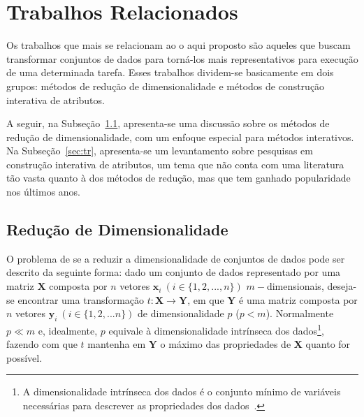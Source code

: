 \section{Trabalhos Relacionados}\label{sec:reld}

Os trabalhos que mais se relacionam ao o aqui proposto são
aqueles que buscam transformar conjuntos de dados para
torná-los mais representativos para execução de uma
determinada tarefa.  Esses trabalhos dividem-se basicamente
em dois grupos: métodos de redução de dimensionalidade e
métodos de construção interativa de atributos. 

A seguir, na Subseção~\ref{sec:rd}, apresenta-se uma
discussão sobre os métodos de redução de dimensionalidade,
com um enfoque especial para métodos interativos. Na
Subseção~\ref{sec:tr}, apresenta-se um levantamento sobre
pesquisas em construção interativa de atributos, um tema que
não conta com uma literatura tão vasta quanto à dos métodos
de redução, mas que tem ganhado popularidade nos últimos
anos. 

\subsection{Redução de Dimensionalidade}\label{sec:rd}

O problema de se a reduzir a dimensionalidade de conjuntos
de dados pode ser descrito da seguinte forma: dado um
conjunto de dados representado por uma matriz $\textbf{X}$
composta por $n$ vetores $\textbf{x}_i~(i \in
\{1,2,...,n\})$ $m-$dimensionais, deseja-se encontrar uma
transformação $t: \textbf{X} \rightarrow \textbf{Y}$, em que
$\textbf{Y}$ é uma matriz composta por $n$ vetores
$\textbf{y}_i~(i \in \{1,2,...n\})$ de dimensionalidade $p$
($p < m$).  Normalmente $p \ll m$ e, idealmente, $p$
equivale à dimensionalidade intrínseca dos dados\footnote{A
dimensionalidade intrínseca dos dados é o conjunto
mínimo de variáveis necessárias para descrever as
propriedades dos dados~\cite{Fukunaga1990}.}, fazendo
com que $t$ mantenha em $\textbf{Y}$ o máximo das
propriedades de $\textbf{X}$ quanto for possível. 

